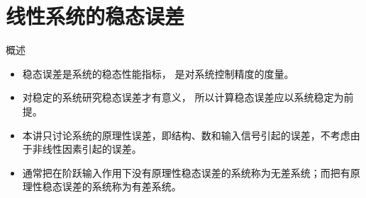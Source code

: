 \documentclass[handout,cjkutf8,table,aspectratio=1610]{beamer} %
\begin{document}
\setcounter{section}{5}
\section{线性系统的稳态误差}
\begin{frame}{概述}
\begin{itemize}
\item 稳态误差是系统的稳态性能指标，
是对系统控制精度的度量。
\item 对稳定的系统研究稳态误差才有意义，
所以计算稳态误差应以系统稳定为前提。 
\item 本讲只讨论系统的原理性误差，即结构、数和输入信号引起的误差，不考虑由于非线性因素引起的误差。
\item 通常把在阶跃输入作用下没有原理性稳态误差的系统称为无差系统；而把有原理性稳态误差的系统称为有差系统。
\end{itemize}
\end{frame}
\end{document}
